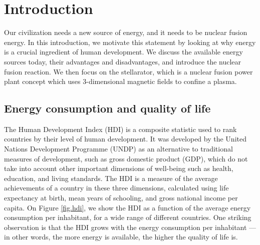 \documentclass[my_thesis.tex]{subfiles}
\begin{document}
\cleardoublepage
\chapter{Introduction}
 

Our civilization needs a new source of energy, and it needs to be nuclear fusion energy. In this introduction, we motivate this statement by looking at why energy is a crucial ingredient of human development. We discuss the available energy sources today, their advantages and disadvantages, and introduce the nuclear fusion reaction. We then focus on the stellarator, which is a nuclear fusion power plant concept which uses 3-dimensional magnetic fields to confine a plasma.

\section{Energy consumption and quality of life}

The Human Development Index (HDI)  \citep{undpunitednationsdevelopmentprogrammeHumanDevelopmentReport1990} is a composite statistic used to rank countries by their level of human development. It was developed by the United Nations Development Programme (UNDP) as an alternative to traditional measures of development, such as gross domestic product (GDP), which do not take into account other important dimensions of well-being such as health, education, and living standards. The HDI is a measure of the average achievements of a country in these three dimensions, calculated using life expectancy at birth, mean years of schooling, and gross national income per capita. On Figure \ref{fig.hdi}, we show the HDI as a function of the average energy consumption per inhabitant, for a wide range of different countries. One striking observation is that the HDI grows with the energy consumption per inhabitant --- in other words, the more energy is available, the higher the quality of life is.
\end{document}
